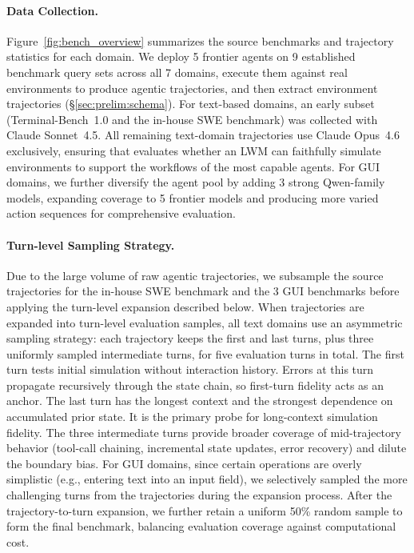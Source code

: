\paragraph{Data Collection.}
Figure~\ref{fig:bench_overview} summarizes the source benchmarks and trajectory statistics for each domain.
We deploy 5 frontier agents on 9 established benchmark query sets across all 7 domains, execute them against real environments to produce agentic trajectories, and then extract environment trajectories (\S\ref{sec:prelim:schema}).
For text-based domains, an early subset (Terminal-Bench~1.0 and the in-house SWE benchmark) was collected with Claude Sonnet~4.5.
All remaining text-domain trajectories use Claude Opus~4.6 exclusively, ensuring that \bench evaluates whether an LWM can faithfully simulate environments to support the workflows of the most capable agents.
For GUI domains, we further diversify the agent pool by adding 3 strong Qwen-family models, expanding coverage to 5 frontier models and producing more varied action sequences for comprehensive evaluation.


\paragraph{Turn-level Sampling Strategy.}
\label{sec:bench:construction:turn_sampling}

Due to the large volume of raw agentic trajectories, we subsample the source trajectories for the in-house SWE benchmark and the 3 GUI benchmarks before applying the turn-level expansion described below.
When trajectories are expanded into turn-level evaluation samples, all text domains use an asymmetric sampling strategy: each trajectory keeps the first and last turns, plus three uniformly sampled intermediate turns, for five evaluation turns in total.
The first turn tests initial simulation without interaction history.
Errors at this turn propagate recursively through the state chain, so first-turn fidelity acts as an anchor.
The last turn has the longest context and the strongest dependence on accumulated prior state. It is the primary probe for long-context simulation fidelity.
The three intermediate turns provide broader coverage of mid-trajectory behavior (tool-call chaining, incremental state updates, error recovery) and dilute the boundary bias.
For GUI domains, since certain operations are overly simplistic (e.g., entering text into an input field), we selectively sampled the more challenging turns from the trajectories during the expansion process.
After the trajectory-to-turn expansion, we further retain a uniform 50\% random sample to form the final benchmark, balancing evaluation coverage against computational cost.

